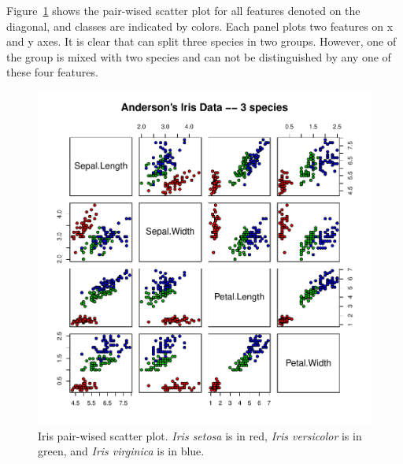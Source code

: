 Figure~\ref{fig:iris_pairs} shows the pair-wised scatter plot for all features
denoted on the diagonal, and classes are indicated by colors. Each panel
plots two features on x and y axes. It is clear
that  can split three species in two groups. However,
one of the group is mixed with two species and can not be distinguished by
any one of these four features.
\begin{figure}[h!bt]
  \centering
  \includegraphics[width=6.5in]{pbdDEMO-include/pics/iris_pairs.pdf}
  \vspace{-1.5cm}
  \caption[Iris pair-wised scatter plot]{
    Iris pair-wised scatter plot. {\it Iris setosa} is in red,
    {\it Iris versicolor} is in green, and {\it Iris virginica} is in blue.
  }
  \label{fig:iris_pairs}
\end{figure}


